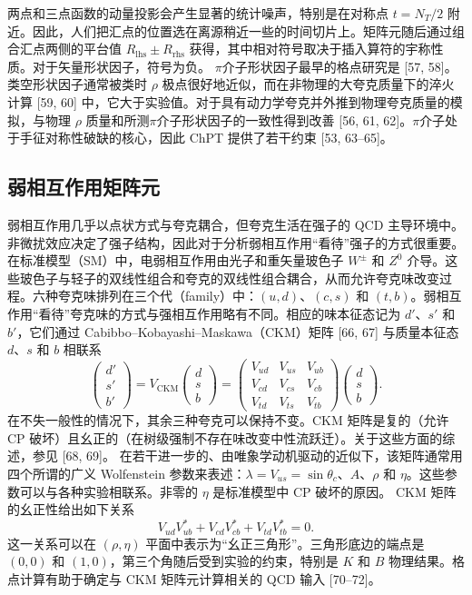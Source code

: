 两点和三点函数的动量投影会产生显著的统计噪声，特别是在对称点 $t = N_T/2$ 附近。因此，人们把汇点的位置选在离源稍近一些的时间切片上。矩阵元随后通过组合汇点两侧的平台值 $R_{\mathrm{lhs}} \pm R_{\mathrm{rhs}}$ 获得，其中相对符号取决于插入算符的宇称性质。对于矢量形状因子，符号为负。
$\pi$介子形状因子最早的格点研究是 [57, 58]。类空形状因子通常被类时 $\rho$ 极点很好地近似，而在非物理的大夸克质量下的淬火计算 [59, 60] 中，它大于实验值。对于具有动力学夸克并外推到物理夸克质量的模拟，与物理 $\rho$ 质量和所测$\pi$介子形状因子的一致性得到改善 [56, 61, 62]。$\pi$介子处于手征对称性破缺的核心，因此 ChPT 提供了若干约束 [53, 63--65]。

\subsection{弱相互作用矩阵元}
弱相互作用几乎以点状方式与夸克耦合，但夸克生活在强子的 QCD 主导环境中。非微扰效应决定了强子结构，因此对于分析弱相互作用“看待”强子的方式很重要。
在标准模型（SM）中，电弱相互作用由光子和重矢量玻色子 $W^\pm$ 和 $Z^0$ 介导。这些玻色子与轻子的双线性组合和夸克的双线性组合耦合，从而允许夸克味改变过程。六种夸克味排列在三个代（family）中：$(u, d)$、$(c, s)$ 和 $(t, b)$。弱相互作用“看待”夸克味的方式与强相互作用略有不同。相应的味本征态记为 $d'$、$s'$ 和 $b'$，它们通过 Cabibbo–Kobayashi–Maskawa（CKM）矩阵 [66, 67] 与质量本征态 $d$、$s$ 和 $b$ 相联系
\begin{equation}
\begin{pmatrix} d' \\ s' \\ b' \end{pmatrix}
= V_{\mathrm{CKM}} \begin{pmatrix} d \\ s \\ b \end{pmatrix}
= \begin{pmatrix}
V_{ud} & V_{us} & V_{ub} \\
V_{cd} & V_{cs} & V_{cb} \\
V_{td} & V_{ts} & V_{tb}
\end{pmatrix}
\begin{pmatrix} d \\ s \\ b \end{pmatrix} .
\end{equation}
在不失一般性的情况下，其余三种夸克可以保持不变。CKM 矩阵是复的（允许 CP 破坏）且幺正的（在树级强制不存在味改变中性流跃迁）。关于这些方面的综述，参见 [68, 69]。
在若干进一步的、由唯象学动机驱动的近似下，该矩阵通常用四个所谓的广义 Wolfenstein 参数来表述：$\lambda = V_{us} = \sin\theta_c$、$A$、$\rho$ 和 $\eta$。这些参数可以与各种实验相联系。非零的 $\eta$ 是标准模型中 CP 破坏的原因。
CKM 矩阵的幺正性给出如下关系
\begin{equation}
V_{ud}V_{ub}^* + V_{cd}V_{cb}^* + V_{td}V_{tb}^* = 0 .
\end{equation}
这一关系可以在 $(\rho, \eta)$ 平面中表示为“幺正三角形”。三角形底边的端点是 $(0, 0)$ 和 $(1, 0)$，第三个角随后受到实验的约束，特别是 $K$ 和 $B$ 物理结果。格点计算有助于确定与 CKM 矩阵元计算相关的 QCD 输入 [70--72]。


